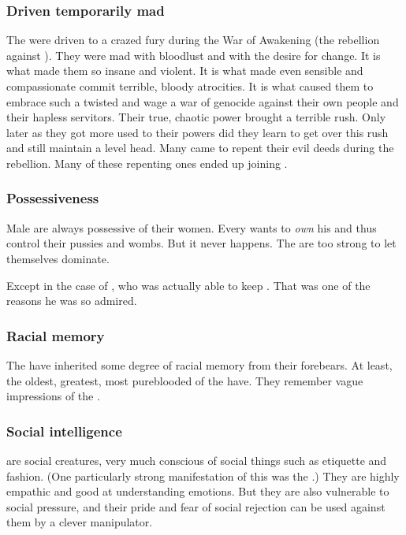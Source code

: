 \subsubsection{Driven temporarily mad}
The \resphain were driven to a crazed fury during the War of Awakening (the rebellion against \Merkyrah).
They were mad with bloodlust and with the desire for change.
It is what made them so insane and violent.
It is what made even sensible and compassionate \resphain commit terrible, bloody atrocities.
It is what caused them to embrace such a twisted  and wage a war of genocide against their own people and their hapless servitors.
Their true, chaotic power brought a terrible rush.
Only later as they got more used to their powers did they learn to get over this rush and still maintain a level head.
Many came to repent their evil deeds during the rebellion.
Many of these repenting ones ended up joining \Kezerad.





\subsubsection{Possessiveness}
Male \resphain{} are always possessive of their women. 
Every \resphan{} wants to \emph{own} his \resviel{} and thus control their pussies and wombs. 
But it never happens. 
The \resviel{} are too strong to let themselves dominate. 

Except in the case of \Zachirah, who was actually able to keep . 
That was one of the reasons he was so admired. 





\subsubsection{Racial memory}
The \resphain{} have inherited some degree of racial memory from their \SitraAchra forebears. 
At least, the oldest, greatest, most pureblooded of the \resphain{} have. 
They remember vague impressions of the . 





\subsubsection{Social intelligence}
\Resphain{} are social creatures, very much conscious of social things such as etiquette and fashion. 
(One particularly strong manifestation of this was the \CiriathSepher{} .)
They are highly empathic and good at understanding emotions. 
But they are also vulnerable to social pressure, and their pride and fear of social rejection can be used against them by a clever manipulator. 

